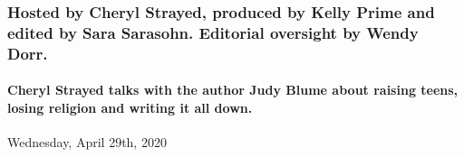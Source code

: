 \hypertarget{hosted-by-cheryl-strayed-produced-by-kelly-prime-and-edited-by-sara-sarasohn-editorial-oversight-by-wendy-dorr-1}{%
\subsubsection{Hosted by Cheryl Strayed, produced by Kelly Prime and
edited by Sara Sarasohn. Editorial oversight by Wendy
Dorr.}\label{hosted-by-cheryl-strayed-produced-by-kelly-prime-and-edited-by-sara-sarasohn-editorial-oversight-by-wendy-dorr-1}}

\hypertarget{cheryl-strayed-talks-with-the-author-judy-blume-about-raising-teens-losing-religion-and-writing-it-all-down-2}{%
\paragraph{Cheryl Strayed talks with the author Judy Blume about raising
teens, losing religion and writing it all
down.}\label{cheryl-strayed-talks-with-the-author-judy-blume-about-raising-teens-losing-religion-and-writing-it-all-down-2}}

Wednesday, April 29th, 2020

